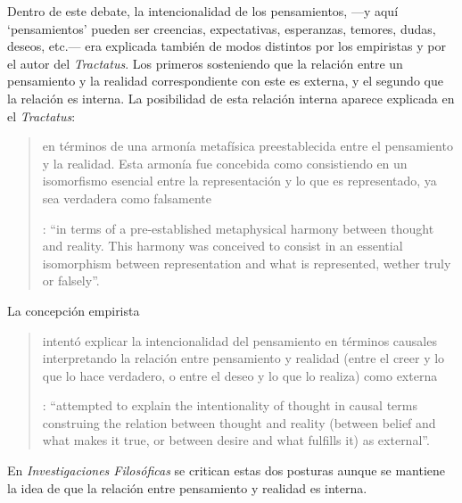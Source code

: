Dentro de este debate, la intencionalidad de los pensamientos, ---y aquí `pensamientos' pueden ser creencias, expectativas, esperanzas, temores, dudas, deseos, etc.--- era explicada también de modos distintos por los empiristas y por el autor del \emph{Tractatus}. Los primeros sosteniendo que la relación entre un pensamiento y la realidad correspondiente con este es externa, y el segundo que la relación es interna. La posibilidad de esta relación interna aparece explicada en el \emph{Tractatus}: \blockquote[{\Cite[3]{hacker2000mind}}: \enquote{in terms of a pre-established metaphysical harmony between thought and reality. This harmony was conceived to consist in an essential isomorphism between representation and what is represented, wether truly or falsely}.]{en términos de una armonía metafísica preestablecida entre el pensamiento y la realidad. Esta armonía fue concebida como consistiendo en un isomorfismo esencial entre la representación y lo que es representado, ya sea verdadera como falsamente}. La concepción empirista \blockquote[{\Cite[3]{hacker2000mind}}: \enquote{attempted to explain the intentionality of thought in causal terms \textelp{} construing the relation between thought and reality (between belief and what makes it true, or between desire and what fulfills it) as external}.]{intentó explicar la intencionalidad del pensamiento en términos causales \textelp{} interpretando la relación entre pensamiento y realidad (entre el creer y lo que lo hace verdadero, o entre el deseo y lo que lo realiza) como externa}. En \emph{Investigaciones Filosóficas} se critican estas dos posturas aunque se mantiene la idea de que la relación entre pensamiento y realidad es interna.

